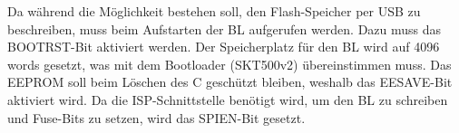 Da während die Möglichkeit bestehen soll, den Flash-Speicher per USB zu beschreiben, muss beim Aufstarten der BL aufgerufen werden. Dazu muss das BOOTRST-Bit aktiviert werden. Der Speicherplatz für den BL wird auf 4096 words gesetzt, was mit dem Bootloader (SKT500v2) übereinstimmen muss. Das EEPROM soll beim Löschen des \textmu C geschützt bleiben, weshalb das EESAVE-Bit aktiviert wird. Da die ISP-Schnittstelle benötigt wird, um den BL zu schreiben und Fuse-Bits zu setzen, wird das SPIEN-Bit gesetzt.
%
%
%
%
%
%
%
%
%
%
%
%
%
%
%
%
%
%
